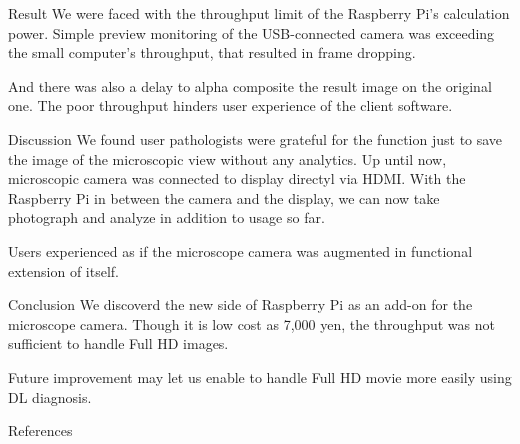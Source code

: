 \documentclass[
  dvipdfmx,
  xcolor={svgnames},
  hyperref={colorlinks,citecolor=DeepPink4,linkcolor=DarkRed,urlcolor=DarkBlue}
  ]{beamer}
\begin{document}
\begin{frame}{Result}
  We were faced with the throughput limit of the Raspberry Pi's calculation power. Simple preview monitoring of the USB-connected camera was exceeding the small computer's throughput, that resulted in frame dropping.
  \par
  \vspace{0.5zh}
  And there was also a delay to alpha composite the result image on the original one. The poor throughput hinders user experience of the client software.
\end{frame}

\begin{frame}{Discussion}
  We found user pathologists were grateful for the function just to save the image of the microscopic view without any analytics. Up until now, microscopic camera was connected to display directyl via HDMI. With the Raspberry Pi in between the camera and the display, we can now take photograph and analyze in addition to usage so far. \par
  \vspace{0.5zh}
  Users experienced as if the microscope camera was augmented in functional extension of itself.
\end{frame}

\begin{frame}{Conclusion}
  We discoverd the new side of Raspberry Pi as an add-on for the microscope camera. Though it is low cost as 7,000 yen, the throughput was not sufficient to handle Full HD images. \par
  \vspace{0.5zh}
  Future improvement may let us enable to handle Full HD movie more easily using DL diagnosis.
\end{frame}

\begin{frame}{References}
  \begin{figure}
    \beamertemplatetextbibitems
    
    
  \end{figure}
\end{frame}
\end{document}
